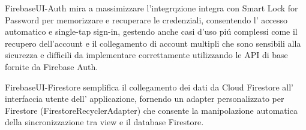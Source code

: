 FirebaseUI-Auth mira a massimizzare l'integrqzione integra con Smart Lock for Password per memorizzare e recuperare le credenziali, consentendo l' accesso automatico e single-tap sign-in, gestendo anche casi d'uso pi\'u complessi come il recupero dell'account e il collegamento di account multipli che sono sensibili alla sicurezza e difficili da implementare correttamente utilizzando le API di base fornite da Firebase Auth.

FirebaseUI-Firestore semplifica il collegamento dei dati da Cloud Firestore all' interfaccia utente dell' applicazione, fornendo un adapter personalizzato per Firestore (FirestoreRecyclerAdapter) che consente la manipolazione automatica della sincronizzazione tra view e il database Firestore.

\clearpage{\pagestyle{empty}\cleardoublepage}
